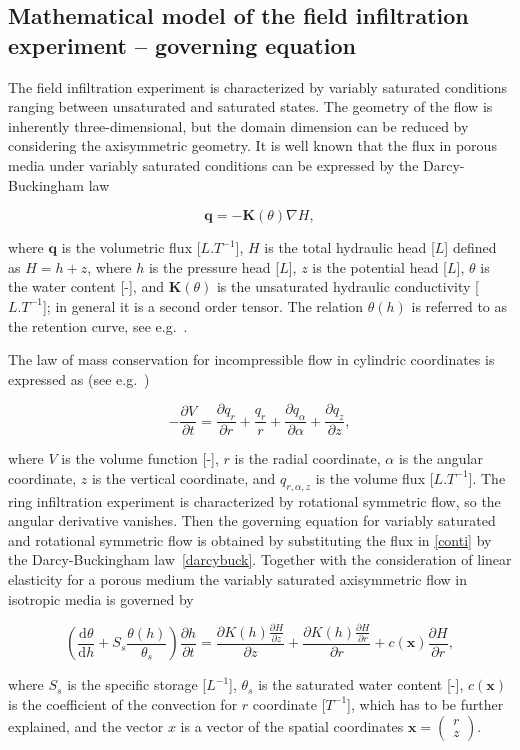 \documentclass[review]{elsarticle}
\newenvironment{lineq}
    {\begin{linenomath*}
    \begin{equation}
    }
    { 
    \end{equation} 
    \end{linenomath*}
    }
\newcommand{\dd}{\mathrm{d}}
\renewcommand{\vec}{\mathbf}
\begin{document}
\subsection{Mathematical model of the field infiltration experiment -- governing equation}%
\label{goveq}


The field infiltration experiment is characterized by variably saturated conditions ranging between unsaturated and saturated states. The geometry of the flow is inherently three-dimensional, but the domain dimension can be reduced by considering the axisymmetric geometry. It is well known that the flux in porous media under variably saturated conditions can be expressed by the Darcy-Buckingham law~\citep{buckingham} \begin{lineq}\label{darcybuck}\vec{q} = -\mathbf{K}(\theta) \nabla H,\end{lineq} where $\vec{q}$ is the volumetric flux [$L.T^{-1}$], $H$ is the total hydraulic head [$L$] defined as $H=h+z$, where $h$ is the pressure head [$L$], $z$ is the potential head [$L$], $\theta$ is the water content [-], and $\mathbf{K}(\theta)$ is the unsaturated hydraulic conductivity  [$L.T^{-1}$]; in general it is a  second order tensor. The relation $\theta(h)$ is referred to as the retention curve, see e.g.~\citep{vangenuchten}.

The law of mass conservation  for incompressible flow in cylindric coordinates  is expressed as (see e.g.~\citep{bear1979})
\begin{lineq}
\label{conti}
-\frac{\partial V}{\partial t} = \frac{\partial q_r}{\partial r} + \frac{q_r}{r} + \frac{\partial q_{\alpha}}{\partial \alpha} + \frac{\partial q_z}{\partial z} ,
\end{lineq}
where $V$ is the volume function [-],  $r$ is the radial coordinate, $\alpha$ is the angular coordinate,  $z$ is the vertical coordinate, and $q_{r, \alpha, z}$ is the  volume flux [$L.T^{-1}$]. The ring infiltration experiment is characterized by rotational symmetric flow, so the angular derivative vanishes. Then the governing equation for  variably saturated and rotational symmetric flow is obtained by substituting the flux in \eqref{conti} by the Darcy-Buckingham law~\eqref{darcybuck}. Together with the consideration of linear elasticity for a porous medium the variably saturated axisymmetric flow in isotropic media is governed by
\begin{lineq}
\label{richaxi}
\left(\frac{\dd \theta}{\dd h} + S_s\frac{\theta(h)}{\theta_s} \right) \frac{\partial h}{\partial t}  =  \frac{\partial K(h) \frac{\partial H}{\partial z}}{\partial z} + \frac{\partial K(h) \frac{\partial H}{\partial r}}{\partial r} + c(\vec{x})\frac{\partial H}{\partial r},
\end{lineq}
where $S_s$ is the specific storage [$L^{-1}$], $\theta_s$ is the saturated water content [-],  $c(\vec{x})$ is the coefficient of the convection for $r$ coordinate [$T^{-1}$], which has to be further explained, and the vector $x$ is a vector of the spatial coordinates $\vec{x}=\left( \begin{smallmatrix} r \\ z \end{smallmatrix} \right)$.
\end{document}
